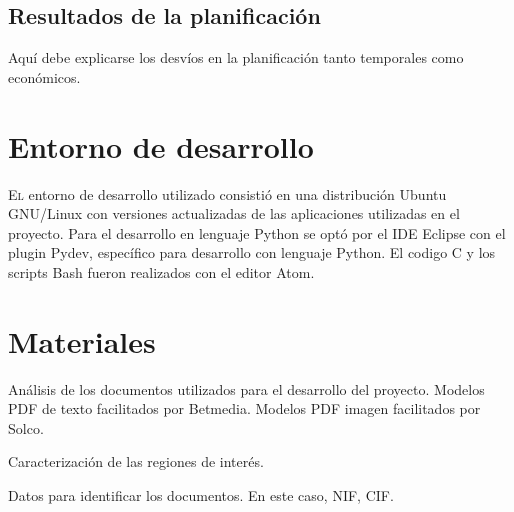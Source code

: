 \section{Resultados de la planificación}

Aquí debe explicarse los desvíos en la planificación tanto temporales como económicos.


\chapter{Entorno de desarrollo}
\label{chap:entorno-desarrollo}

\lettrine{E}{l} entorno de desarrollo utilizado consistió en una distribución Ubuntu GNU/Linux con versiones actualizadas de las aplicaciones utilizadas en el proyecto. Para el desarrollo en lenguaje Python se optó por el IDE Eclipse con el plugin Pydev, específico para desarrollo con lenguaje Python. El codigo C y los scripts Bash fueron realizados con el editor Atom.

\chapter{Materiales}
\label{chap:materiales}

Análisis de los documentos utilizados para el desarrollo del proyecto. Modelos PDF de texto facilitados por Betmedia. Modelos PDF imagen facilitados por Solco.

Caracterización de las regiones de interés.

Datos para identificar los documentos. En este caso, NIF, CIF.
